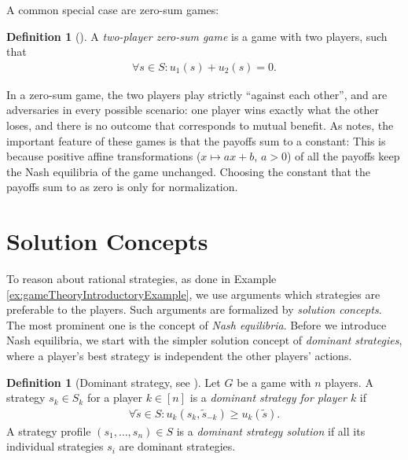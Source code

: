 \documentclass[a4paper,DIV=11]{scrreprt}
\theoremstyle{definition}
\newtheorem{defn}[thm]{Definition} %
\begin{document}
    A common special case are zero-sum games:
    
    \begin{defn}[{\cite[p.4]{bib:fudenbergGameTheory}}]
        A \emph{two-player zero-sum game} is a game with two players, such that
        \begin{gather*} 
            \forall s \in S: u_1(s) + u_2(s) = 0.
        \end{gather*}
    \end{defn}

    In a zero-sum game, the two players play strictly “against each other”, and are adversaries in every possible scenario:
    one player wins exactly what the other loses, and there is no outcome that corresponds to mutual benefit. As \cite{bib:fudenbergGameTheory} notes, the important feature of these games is that the payoffs sum to a constant: 
    This is because positive affine transformations ($x \mapsto ax + b$, $a > 0$) of all the payoffs keep the Nash equilibria of the game unchanged.
    Choosing the constant that the payoffs sum to as zero is only for normalization.
    
    \section{Solution Concepts}
    To reason about rational strategies, as done in Example \ref{ex:gameTheoryIntroductoryExample}, we use arguments which strategies are preferable to the players. Such arguments are formalized by \emph{solution concepts}.
    The most prominent one is the concept of \emph{Nash equilibria}.
    Before we introduce Nash equilibria, we start with the simpler solution concept of \emph{dominant strategies}, where a player's best strategy is independent the other players' actions.
    
    \begin{defn}[Dominant strategy, see \cite{bib:nisanAlgorithmicGameTheoryCh1Basic}]
        Let $G$ be a game with $n$ players.
        A strategy $s_k \in S_k$ for a player $k \in [n]$ is a \emph{dominant strategy for player $k$} if 
        \begin{gather*}  
            \forall \tilde{s} \in S: u_k(s_k, \tilde{s}_{-k}) \geq u_k(\tilde{s}). 
        \end{gather*} 
        A strategy profile $(s_1, \dots, s_n) \in S$ is a \emph{dominant strategy solution} if all its individual strategies $s_i$ are dominant strategies.
    \end{defn}
    
\end{document}
